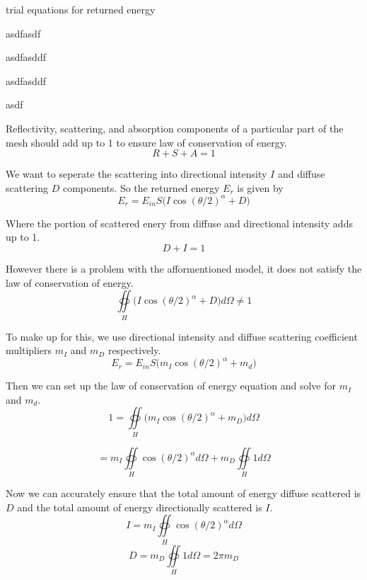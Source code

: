 \documentclass[onecolumn]{IEEEtran}
\begin{document}
trial equations for returned energy

asdfasdf


asdfasddf

asdfasddf

asdf

Reflectivity, scattering, and absorption components of a particular part of the mesh should add up to 1 to ensure law of conservation of energy.
\begin{equation}
    R+S+A = 1
\end{equation}

We want to seperate the scattering into directional intensity $I$ and diffuse scattering $D$ components. So the returned energy $E_r$ is given by
\begin{equation}
    E_r = E_{in} S \Big(I\cos({\theta/2})^\alpha + D\Big)
\end{equation}

Where the portion of scattered enery from diffuse and directional intensity adds up to 1.
\begin{equation}
    D + I = 1
\end{equation}

However there is a problem with the afformentioned model, it does not satisfy the law of conservation of energy.
\begin{equation}
    \oiint\limits_{H} \Big(I\cos({\theta/2})^\alpha + D\Big)d\Omega \neq 1
\end{equation}

To make up for this, we use directional intensity and diffuse scattering coefficient multipliers $m_I$ and $m_D$ respectively.
\begin{equation}
    E_r = E_{in} S \Big(m_I\cos({\theta/2})^\alpha + m_d\Big)
\end{equation}

Then we can set up the law of conservation of energy equation and solve for $m_I$ and $m_d$.
\begin{equation}
    1 = \oiint\limits_{H} \Big(m_I\cos({\theta/2})^\alpha + m_D\Big)d\Omega
\end{equation}

\begin{equation}
    = m_I \oiint\limits_{H} \cos({\theta/2})^\alpha d \Omega + m_D \oiint\limits_{H} 1 d \Omega
\end{equation}

Now we can accurately ensure that the total amount of energy diffuse scattered is $D$ and the total amount of energy directionally scattered is $I$.
\begin{equation}
    I = m_I \oiint\limits_{H} \cos({\theta/2})^\alpha d \Omega
\end{equation}
\begin{equation}
    D =  m_D \oiint\limits_{H} 1 d \Omega = 2 \pi m_D
\end{equation}
\end{document}
